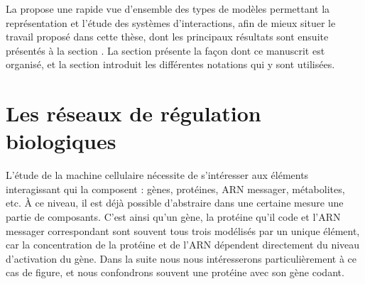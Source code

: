 

La  propose une rapide vue d'ensemble des types de modèles permettant
la représentation et l'étude des systèmes d'interactions,
afin de mieux situer le travail proposé dans cette thèse,
dont les principaux résultats sont ensuite présentés à la section .
La section  présente la façon dont ce manuscrit est organisé,
et la section  introduit les différentes notations qui y sont utilisées.



\section{Les réseaux de régulation biologiques}


\stodo{[Thomas'73], [Paulevé'11 et '12]}


L'étude de la machine cellulaire nécessite de s'intéresser aux éléments interagissant
qui la composent :
gènes, protéines, ARN messager, métabolites, etc.
% 
À ce niveau, il est déjà possible d'abstraire dans une certaine mesure
une partie de composants.
C'est ainsi qu'un gène, la protéine qu'il code et l'ARN messager correspondant sont
souvent tous trois modélisés par un unique élément,
car la concentration de la protéine et de l'ARN
dépendent directement du niveau d'activation du gène.
Dans la suite nous nous intéresserons particulièrement à ce cas de figure,
et nous confondrons souvent une protéine avec son gène codant.

